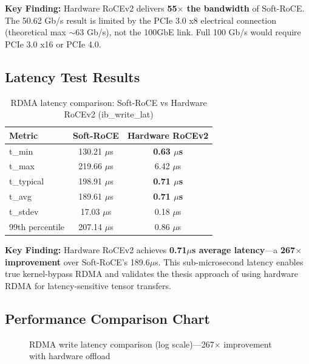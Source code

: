 \documentclass[10pt,letterpaper]{article}
\begin{document}
\textbf{Key Finding:} Hardware RoCEv2 delivers \textbf{55$\times$ the bandwidth} of Soft-RoCE. The 50.62 Gb/s result is limited by the PCIe 3.0 x8 electrical connection (theoretical max $\sim$63 Gb/s), not the 100GbE link. Full 100 Gb/s would require PCIe 3.0 x16 or PCIe 4.0.

\subsection{Latency Test Results}

\begin{table}[H]
\centering
\small
\begin{tabular}{@{}lcc@{}}
\toprule
\textbf{Metric} & \textbf{Soft-RoCE} & \textbf{Hardware RoCEv2} \\
\midrule
t\_min & 130.21 $\mu$s & \textbf{0.63 $\mu$s} \\
t\_max & 219.66 $\mu$s & 6.42 $\mu$s \\
t\_typical & 198.91 $\mu$s & \textbf{0.71 $\mu$s} \\
t\_avg & 189.61 $\mu$s & \textbf{0.71 $\mu$s} \\
t\_stdev & 17.03 $\mu$s & 0.18 $\mu$s \\
99th percentile & 207.14 $\mu$s & 0.86 $\mu$s \\
\bottomrule
\end{tabular}
\caption{RDMA latency comparison: Soft-RoCE vs Hardware RoCEv2 (ib\_write\_lat)}
\end{table}

\textbf{Key Finding:} Hardware RoCEv2 achieves \textbf{0.71$\mu$s average latency}---a \textbf{267$\times$ improvement} over Soft-RoCE's 189.6$\mu$s. This sub-microsecond latency enables true kernel-bypass RDMA and validates the thesis approach of using hardware RDMA for latency-sensitive tensor transfers.

\subsection{Performance Comparison Chart}

\begin{figure}[H]
\centering
{}
\caption{RDMA write latency comparison (log scale)---267$\times$ improvement with hardware offload}
\end{figure}
\end{document}

